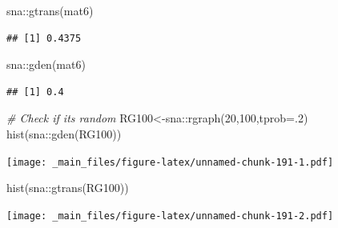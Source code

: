 \documentclass[
  notitlepage,
  onecolumn,
  openany]{book}
\newenvironment{Shaded}{\begin{snugshade}}{\end{snugshade}}
\newcommand{\AttributeTok}[1]{\textcolor[rgb]{0.77,0.63,0.00}{#1}}
\newcommand{\CommentTok}[1]{\textcolor[rgb]{0.56,0.35,0.01}{\textit{#1}}}
\newcommand{\DecValTok}[1]{\textcolor[rgb]{0.00,0.00,0.81}{#1}}
\newcommand{\FunctionTok}[1]{\textcolor[rgb]{0.00,0.00,0.00}{#1}}
\newcommand{\NormalTok}[1]{#1}
\newcommand{\OtherTok}[1]{\textcolor[rgb]{0.56,0.35,0.01}{#1}}
\newcommand{\SpecialCharTok}[1]{\textcolor[rgb]{0.00,0.00,0.00}{#1}}
\begin{document}
\begin{Shaded}
\begin{Highlighting}[]
\NormalTok{sna}\SpecialCharTok{::}\FunctionTok{gtrans}\NormalTok{(mat6)}
\end{Highlighting}
\end{Shaded}

\begin{verbatim}
## [1] 0.4375
\end{verbatim}

\begin{Shaded}
\begin{Highlighting}[]
\NormalTok{sna}\SpecialCharTok{::}\FunctionTok{gden}\NormalTok{(mat6)}
\end{Highlighting}
\end{Shaded}

\begin{verbatim}
## [1] 0.4
\end{verbatim}

\begin{Shaded}
\begin{Highlighting}[]
\CommentTok{\# Check if it\textquotesingle{}s random}
\NormalTok{RG100}\OtherTok{\textless{}{-}}\NormalTok{sna}\SpecialCharTok{::}\FunctionTok{rgraph}\NormalTok{(}\DecValTok{20}\NormalTok{,}\DecValTok{100}\NormalTok{,}\AttributeTok{tprob=}\NormalTok{.}\DecValTok{2}\NormalTok{)}
\FunctionTok{hist}\NormalTok{(sna}\SpecialCharTok{::}\FunctionTok{gden}\NormalTok{(RG100))}
\end{Highlighting}
\end{Shaded}

\texttt{[image: \_main\_files/figure-latex/unnamed-chunk-191-1.pdf]}

\begin{Shaded}
\begin{Highlighting}[]
\FunctionTok{hist}\NormalTok{(sna}\SpecialCharTok{::}\FunctionTok{gtrans}\NormalTok{(RG100))}
\end{Highlighting}
\end{Shaded}

\texttt{[image: \_main\_files/figure-latex/unnamed-chunk-191-2.pdf]}
\end{document}
